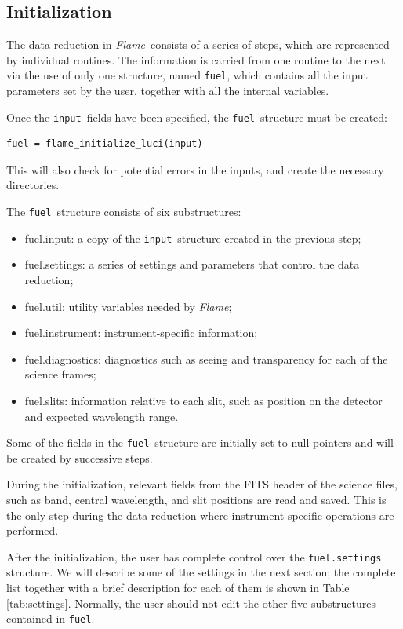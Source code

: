 \documentclass[a4paper]{article}
\newcommand{\flame}{\emph{Flame}}
\newcommand{\fuel}{\texttt{fuel}}
\newcommand{\inp}{\texttt{input}}
\begin{document}
\begin{sloppypar}
\subsection{Initialization}

The data reduction in \flame\ consists of a series of steps, which are represented by individual routines. The information is carried from one routine to the next via the use of only one structure, named \fuel, which contains all the input parameters set by the user, together with all the internal variables.

Once the \inp\ fields have been specified, the \fuel\ structure must be created:
\begin{lstlisting}
fuel = flame_initialize_luci(input)
\end{lstlisting}
This will also check for potential errors in the inputs, and create the necessary directories.

The \fuel\ structure consists of six substructures:
\begin{itemize}
	\item fuel.input: a copy of the \inp\ structure created in the previous step;
  \item fuel.settings: a series of settings and parameters that control the data reduction;
	\item fuel.util: utility variables needed by \flame;
	\item fuel.instrument: instrument-specific information;
	\item fuel.diagnostics: diagnostics such as seeing and transparency for each of the science frames;
	\item fuel.slits: information relative to each slit, such as position on the detector and expected wavelength range.
\end{itemize}

Some of the fields in the \fuel\ structure are initially set to null pointers and will be created by successive steps.

During the initialization, relevant fields from the FITS header of the science files, such as band, central wavelength, and slit positions are read and saved. This is the only step during the data reduction where instrument-specific operations are performed.

After the initialization, the user has complete control over the \texttt{fuel.settings} structure. We will describe some of the settings in the next section; the complete list together with a brief description for each of them is shown in Table \ref{tab:settings}. Normally, the user should not edit the other five substructures contained in \fuel.


\end{sloppypar}
\end{document}
